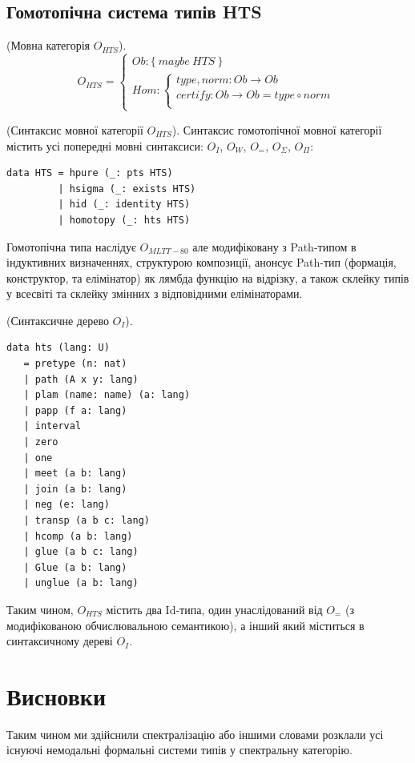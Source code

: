 \newpage
\subsection{Гомотопічна система типів HTS}

\begin{definition} (Мовна категорія $O_{HTS}$).
$$
O_{HTS} =
\begin{cases}
Ob: \{\ maybe\ HTS\ \} \\
Hom: \begin{cases}
type,norm: Ob \rightarrow Ob \\
certify: Ob \rightarrow Ob = type \circ norm \\
\end{cases}
\end{cases}
$$
\end{definition}

\begin{definition} (Синтаксис мовної категорії $O_{HTS}$).
Синтаксис гомотопічної мовної категорії містить усі
попередні мовні синтаксиси: $O_I$, $O_W$, $O_=$, $O_\Sigma$, $O_\Pi$:
\begin{lstlisting}
data HTS = hpure (_: pts HTS)
         | hsigma (_: exists HTS)
         | hid (_: identity HTS)
         | homotopy (_: hts HTS)
\end{lstlisting}
\end{definition}

Гомотопічна типа наслідує $O_{MLTT-80}$ але модифіковану з
Path-типом в індуктивних визначеннях, структурою композиції,
анонсує Path-тип (формація, конструктор, та елімінатор)
як лямбда функцію на відрізку, а також склейку типів у всесвіті
та склейку змінних з відповідними елімінаторами.

\begin{definition} (Синтаксичне дерево $O_I$).
\begin{lstlisting}
data hts (lang: U)
   = pretype (n: nat)
   | path (A x y: lang)
   | plam (name: name) (a: lang)
   | papp (f a: lang)
   | interval
   | zero
   | one
   | meet (a b: lang)
   | join (a b: lang)
   | neg (e: lang)
   | transp (a b c: lang)
   | hcomp (a b: lang)
   | glue (a b c: lang)
   | Glue (a b: lang)
   | unglue (a b: lang)
\end{lstlisting}
\end{definition}

Таким чином,
$O_{HTS}$ містить два Id-типа, один унаслідований від $O_=$ (з модифікованою
обчислювальною семантикою), а інший який міститься в синтаксичному дереві $O_I$.

\newpage
\section{Висновки}

Таким чином ми здійснили спектралізацію або іншими словами розклали усі
існуючі немодальні формальні системи типів у спектральну категорію.
